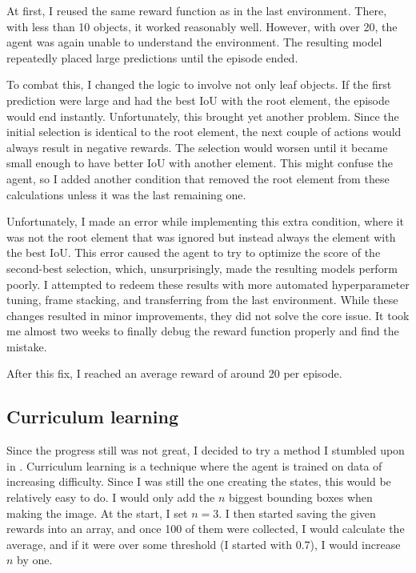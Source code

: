 \documentclass[
  digital,     %
  oneside,     %
  nosansbold,  %
  nocolorbold, %
  lof,         %
  lot,         %
]{fithesis4}
\begin{document}
At first, I reused the same reward function as in the last environment. There, with less than 10 objects, it worked reasonably well. However, with over 20, the agent was again unable to understand the environment. The resulting model repeatedly placed large predictions until the episode ended.

To combat this, I changed the logic to involve not only leaf objects. If the first prediction were large and had the best IoU with the root element, the episode would end instantly. Unfortunately, this brought yet another problem. Since the initial selection is identical to the root element, the next couple of actions would always result in negative rewards. The selection would worsen until it became small enough to have better IoU with another element. This might confuse the agent, so I added another condition that removed the root element from these calculations unless it was the last remaining one.

Unfortunately, I made an error while implementing this extra condition, where it was not the root element that was ignored but instead always the element with the best IoU. This error caused the agent to try to optimize the score of the second-best selection, which, unsurprisingly, made the resulting models perform poorly. I attempted to redeem these results with more automated hyperparameter tuning, frame stacking, and transferring from the last environment. While these changes resulted in minor improvements, they did not solve the core issue. It took me almost two weeks to finally debug the reward function properly and find the mistake.

After this fix, I reached an average reward of around 20 per episode.

\subsection{Curriculum learning}

Since the progress still was not great, I decided to try a method I stumbled upon in \cite{GDRL}. Curriculum learning is a technique where the agent is trained on data of increasing difficulty. Since I was still the one creating the states, this would be relatively easy to do. I would only add the $n$ biggest bounding boxes when making the image. At the start, I set $n=3$. I then started saving the given rewards into an array, and once 100 of them were collected, I would calculate the average, and if it were over some threshold (I started with 0.7), I would increase $n$ by one.
\end{document}
